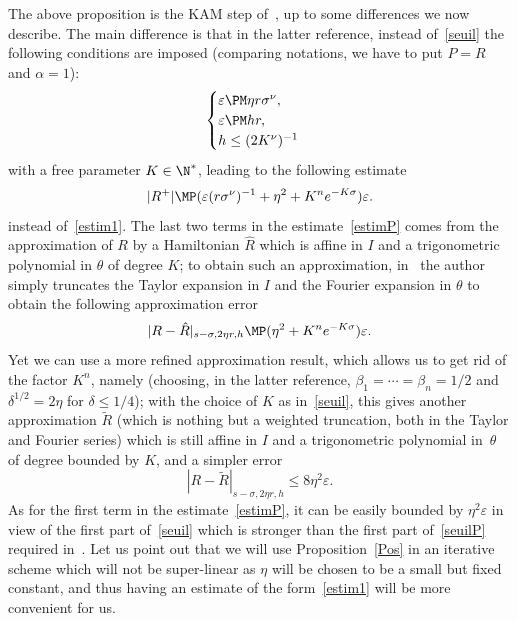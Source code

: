 The above proposition is the KAM step of~\cite{Pos01}, up to some differences we now describe. The main difference is that in the latter reference, instead of~\eqref{seuil} the following conditions are imposed (comparing notations, we have to put $P=R$ and $\alpha=1$):
\begin{equation}\label{seuilP}
\begin{cases}
\varepsilon \PM \eta r \sigma^{\nu}, \\
\varepsilon \PM h r, \\
h \leq (2K^{\nu})^{-1}
\end{cases}
\end{equation}
with a free parameter $K \in \N^*$, leading to the following estimate
\begin{equation}\label{estimP}
|R^+| \MP (\varepsilon(r\sigma^\nu)^{-1}+\eta^2+K^ne^{-K\sigma})\varepsilon.
\end{equation}
instead of~\eqref{estim1}. The last two terms in the estimate~\eqref{estimP} comes from the approximation of $R$ by a Hamiltonian $\hat{R}$ which is affine in $I$ and a trigonometric polynomial in $\theta$ of degree $K$; to obtain such an approximation, in~\cite{Pos01} the author simply truncates the Taylor expansion in $I$ and the Fourier expansion in $\theta$ to obtain the following approximation error
\[ |R-\hat{R}|_{s-\sigma,2\eta r, h} \MP (\eta^2+K^ne^{-K\sigma})\varepsilon. \]
Yet we can use a more refined approximation result, which allows us to get rid of the factor $K^n$, namely \cite[Th.\,7.2]{Rus01} (choosing, in the latter reference, $\beta_1=\cdots=\beta_n=1/2$ and $\delta^{1/2}=2\eta$ for $\delta \leq 1/4$); with the choice of $K$ as in~\eqref{seuil}, this gives another approximation $\tilde{R}$ (which is nothing but a weighted truncation, both in the Taylor and Fourier series) which is still affine in $I$ and a trigonometric polynomial in~$\theta$ of degree bounded by $K$, and a simpler error
\[ |R-\tilde{R}|_{s-\sigma,2\eta r, h} \leq 8\eta^2\varepsilon. \]
As for the first term in the estimate~\eqref{estimP}, it can be easily bounded by $\eta^2\varepsilon$ in view of the first part of~\eqref{seuil} which is stronger than the first part of~\eqref{seuilP} required in~\cite{Pos01}. Let us point out that we will use Proposition~\ref{Pos} in an iterative scheme which will not be super-linear as $\eta$ will be chosen to be a small but fixed constant, and thus having an estimate of the form~\eqref{estim1} will be more convenient for us.

